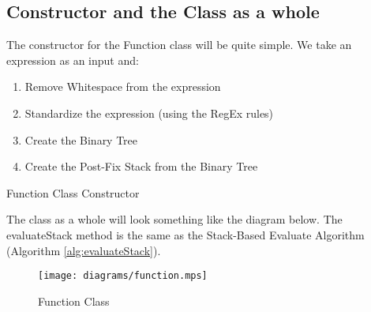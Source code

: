 \documentclass[../../../../../main.tex]{subfiles}
\begin{document}
\subsection{Constructor and the Class as a whole}
The constructor for the Function class will be quite simple. We take an expression as an input and:
\begin{enumerate}
	\item Remove Whitespace from the expression
	\item Standardize the expression (using the RegEx rules)
	\item Create the Binary Tree
	\item Create the Post-Fix Stack from the Binary Tree
\end{enumerate}
\begin{algorithm}
\DontPrintSemicolon
\caption{Function Class Constructor}
\end{algorithm}
The class as a whole will look something like the diagram below. The evaluateStack method is the same as the Stack-Based Evaluate Algorithm (Algorithm \ref{alg:evaluateStack}).
\begin{figure}[H]
	\centering
	\texttt{[image: diagrams/function.mps]}
	\caption{Function Class}
\end{figure}
\end{document}
